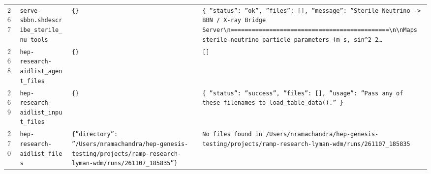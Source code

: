 \documentclass[11pt,a4paper]{article}
\begin{document}
\begin{longtable}{@{}p{}p{}p{}p{}@{}}
267 & \texttt{serve-sbbn.sh}\newline\texttt{describe\_\allowbreak{}sterile\_\allowbreak{}nu\_\allowbreak{}tools} & \texttt{\{\}\allowbreak{}} & \texttt{\{   ''status'':\allowbreak{} ''ok'',\allowbreak{}   ''files'':\allowbreak{} []\allowbreak{},\allowbreak{}   ''message'':\allowbreak{} ''Sterile Neutrino -\textgreater{}\allowbreak{} BBN /\allowbreak{} X-ray Bridge Server\textbackslash{}\allowbreak{}n=\allowbreak{}=\allowbreak{}=\allowbreak{}=\allowbreak{}=\allowbreak{}=\allowbreak{}=\allowbreak{}=\allowbreak{}=\allowbreak{}=\allowbreak{}=\allowbreak{}=\allowbreak{}=\allowbreak{}=\allowbreak{}=\allowbreak{}=\allowbreak{}=\allowbreak{}=\allowbreak{}=\allowbreak{}=\allowbreak{}=\allowbreak{}=\allowbreak{}=\allowbreak{}=\allowbreak{}=\allowbreak{}=\allowbreak{}=\allowbreak{}=\allowbreak{}=\allowbreak{}=\allowbreak{}=\allowbreak{}=\allowbreak{}=\allowbreak{}=\allowbreak{}=\allowbreak{}=\allowbreak{}=\allowbreak{}=\allowbreak{}=\allowbreak{}=\allowbreak{}=\allowbreak{}=\allowbreak{}=\allowbreak{}=\allowbreak{}=\allowbreak{}\textbackslash{}\allowbreak{}n\textbackslash{}\allowbreak{}nMaps sterile-neutrino particle parameters (m\_\allowbreak{}s,\allowbreak{} sin\textasciicircum{}\allowbreak{}2 2\ldots{}\allowbreak{}} \\
268 & \texttt{hep-research-aid}\newline\texttt{list\_\allowbreak{}agent\_\allowbreak{}files} & \texttt{\{\}\allowbreak{}} & \texttt{[]\allowbreak{}} \\
269 & \texttt{hep-research-aid}\newline\texttt{list\_\allowbreak{}input\_\allowbreak{}files} & \texttt{\{\}\allowbreak{}} & \texttt{\{   ''status'':\allowbreak{} ''success'',\allowbreak{}   ''files'':\allowbreak{} []\allowbreak{},\allowbreak{}   ''usage'':\allowbreak{} ''Pass any of these filenames to load\_\allowbreak{}table\_\allowbreak{}data()\allowbreak{}.'' \}\allowbreak{}} \\
270 & \texttt{hep-research-aid}\newline\texttt{list\_\allowbreak{}files} & \texttt{\{''directory'':\allowbreak{} ''/\allowbreak{}Users/\allowbreak{}nramachandra/\allowbreak{}hep-genesis-testing/\allowbreak{}projects/\allowbreak{}ramp-research-lyman-wdm/\allowbreak{}runs/\allowbreak{}261107\_\allowbreak{}185835''\}\allowbreak{}} & \texttt{No files found in /\allowbreak{}Users/\allowbreak{}nramachandra/\allowbreak{}hep-genesis-testing/\allowbreak{}projects/\allowbreak{}ramp-research-lyman-wdm/\allowbreak{}runs/\allowbreak{}261107\_\allowbreak{}185835} \\

\end{longtable}
\end{document}
